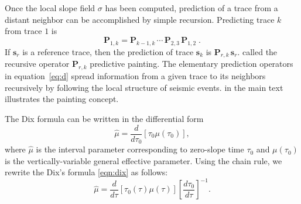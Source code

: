 Once the local slope field $\sigma$ has been computed, prediction of a
trace from a distant neighbor can be accomplished by simple
recursion. Predicting trace $k$ from trace $1$ is
\begin{equation}
  \label{eq:pred}
  \mathbf{P}_{1,k} = \mathbf{P}_{k-1,k}\,
  \cdots\,\mathbf{P}_{2,3}\,\mathbf{P}_{1,2}\;.
\end{equation}
If $\mathbf{s}_r$ is a reference trace, then the prediction of trace
  $\mathbf{s}_k$ is $\mathbf{P}_{r,k}\,\mathbf{s}_r$. \cite{fomel:A25}
  called the recursive operator $\mathbf{P}_{r,k}$ predictive
  painting. The elementary prediction operators in equation~\ref{eq:d}
  spread information from a given trace to its neighbors recursively
  by following the local structure of seismic events. 
  in the main text illustrates the painting concept.



The Dix formula \citep{dix:68} can be written in the differential form
\begin{equation}
\hat{\mu}=\frac{d}{{d\tau _{0}}}\left[ {\tau _{0}\mu (\tau _{0})}\right] ,
\label{eqn:dix}
\end{equation}
where $\hat{\mu}$ is the interval parameter corresponding to
zero-slope time ${\tau _{0}}$ {and }${\mu (\tau _{0})}$ is the
vertically-variable general effective parameter. Using the chain
rule, we rewrite the Dix's formula \ref{eqn:dix} as follows:
\begin{equation}
\hat{\mu}=\frac{d}{{d\tau }}\left[ {\tau _{0}(\tau )\mu (\tau )}\right] %
\left[ \frac{d{\tau }_{0}}{{d\tau }}\right] ^{-1}.  \label{eqn:dixchain2}
\end{equation}

